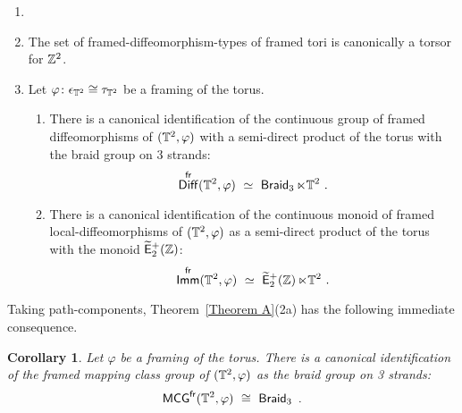 \documentclass{amsart}
\newenvironment{mythm}[1]
  {\renewcommand\theinnercustomthm{#1}\innercustomthm}
  {\endinnercustomthm}
\newtheorem{cor}[theorem]{Corollary}
\theoremstyle{definition}
\theoremstyle{remark}
\DeclareMathOperator{\Diff}{{\sf Diff}}
\DeclareMathOperator{\fr}{\sf fr}
\newcommand{\w}{\widetilde}
\DeclareMathOperator{\Braid}{{\sf Braid}_3}
\DeclareMathOperator{\Ebraid}{\w{\sf E}_{2}^{+}(\ZZ)}
\DeclareMathOperator{\Imm}{\sf Imm}
\begin{document}
\begin{mythm}{A}%
\label{Theorem A}

\begin{enumerate}

\item[~]

\item
The set of framed-diffeomorphism-types of framed tori is canonically a torsor for $\mathbb Z^2$.  



\item
Let $\varphi\colon \epsilon_{\mathbb T^2} \cong \tau_{\mathbb T^2}$ be a framing of the torus.  

\begin{enumerate}

\item
There is a canonical identification of the continuous group of framed diffeomorphisms of $(\mathbb T^2,\varphi)$ with a semi-direct product of the torus with the braid group on 3 strands:
\[
\Diff^{\fr}(\TT^2,\varphi)
~\simeq~
\Braid \ltimes \TT^2
~.
\]







\item
There is a canonical identification of the continuous monoid of framed local-diffeomorphisms of $(\mathbb T^2,\varphi)$ as a semi-direct product of the torus with the monoid $\Ebraid$:
\[
\Imm^{\fr}(\TT^2,\varphi)
~\simeq~
\Ebraid \ltimes \TT^2
~.
\]


\end{enumerate}






\end{enumerate}

\end{mythm}


Taking path-components, Theorem~\ref{Theorem A}(2a) has the following immediate consequence.
\begin{cor}
\label{t38}
Let $\varphi$ be a framing of the torus.
There is a canonical identification of the framed mapping class group of $(\mathbb T^2,\varphi)$ as the braid group on 3 strands:
\[
{\sf MCG}^{\fr}(\TT^2,\varphi)
~\cong~
\Braid
~.
\]
\end{cor}
\end{document}
